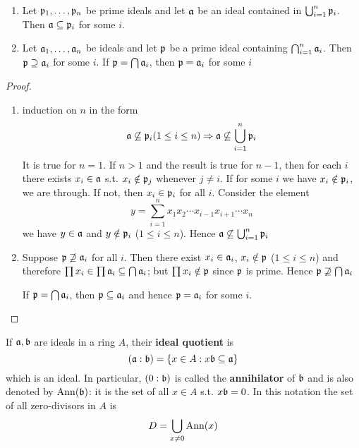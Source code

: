 \documentclass[11pt]{article}
\begin{document}
\begin{proposition}[]
\begin{enumerate}
\item Let \(\mathfrak{p}_1,\dots,\mathfrak{p}_n\) be prime ideals and let \(\mathfrak{a}\) be an ideal contained in \(\bigcup_{i=1}^n\mathfrak{p}_i\).
Then \(\mathfrak{a}\subseteq\mathfrak{p}_i\) for some \(i\).
\item Let \(\mathfrak{a}_1,\dots,\mathfrak{a}_n\) be ideals and let \(\mathfrak{p}\) be a prime ideal containing \(\bigcap_{i=1}^n\mathfrak{a}_i\).
Then \(\mathfrak{p}\supseteq\mathfrak{a}_i\) for some \(i\). If \(\mathfrak{p}=\bigcap\mathfrak{a}_i\), then \(\mathfrak{p}=\mathfrak{a}_i\) for some \(i\)
\end{enumerate}
\end{proposition}

\begin{proof}
\begin{enumerate}
\item induction on \(n\) in the form
\begin{equation*}
\mathfrak{a}\not\subseteq\mathfrak{p}_i(1\le i\le n)\Rightarrow\mathfrak{a}\not\subseteq\bigcup_{i=1}^n\mathfrak{p}_i
\end{equation*}
It is true for \(n=1\). If \(n>1\) and the result is true for \(n-1\), then for each \(i\)
there exists \(x_i\in\mathfrak{a}\) s.t. \(x_i\notin\mathfrak{p}_j\) whenever \(j\neq i\). If for some \(i\) we have \(x_i\notin\mathfrak{p}_i\),
we are through. If not, then \(x_i\in\mathfrak{p}_i\) for all \(i\). Consider the element
\begin{equation*}
y=\sum_{i=1}^nx_1x_2\cdots x_{i-1}x_{i+1}\cdots x_n
\end{equation*}
we have \(y\in\mathfrak{a}\) and \(y\notin\mathfrak{p}_i\) (\(1\le i\le n\)). Hence \(\mathfrak{a}\not\subseteq\bigcup_{i=1}^n\mathfrak{p}_i\)
\item Suppose \(\mathfrak{p}\not\supseteq\mathfrak{a}_i\) for all \(i\). Then there exist \(x_i\in\mathfrak{a}_i\), \(x_i\notin\mathfrak{p}\) (\(1\le i\le n\)) and
therefore \(\prod x_i\in\prod\mathfrak{a}_i\subseteq\bigcap\mathfrak{a}_i\); but \(\prod x_i\notin\mathfrak{p}\) since \(\mathfrak{p}\) is prime. Hence \(\mathfrak{p}\not\supseteq\bigcap\mathfrak{a}_i\)

If \(\mathfrak{p}=\bigcap\mathfrak{a}_i\), then \(\mathfrak{p}\subseteq\mathfrak{a}_i\) and hence \(\mathfrak{p}=\mathfrak{a}_i\) for some \(i\).
\end{enumerate}
\end{proof}

If \(\mathfrak{a},\mathfrak{b}\) are ideals in a ring \(A\), their \textbf{ideal quotient} is
\begin{equation*}
(\mathfrak{a}:\mathfrak{b})=\{x\in A:x\mathfrak{b}\subseteq\mathfrak{a}\}
\end{equation*}
which is an ideal. In particular, \((0:\mathfrak{b})\) is called the \textbf{annihilator} of \(\mathfrak{b}\) and is also
denoted by \(\operatorname{Ann}(\mathfrak{b})\): it is the set of all \(x\in A\) s.t. \(x\mathfrak{b}=0\). In this notation the set of
all zero-divisors in \(A\) is
\begin{equation*}
D=\bigcup_{x\neq 0}\operatorname{Ann}(x)
\end{equation*}
\end{document}
